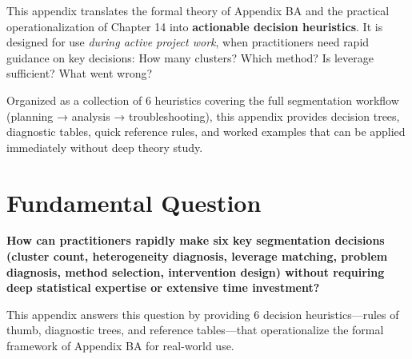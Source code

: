 \vspace{1em}


\begin{tcolorbox}[colback=blue!5!white, colframe=blue!75!black,
    title=Abstract]

This appendix translates the formal theory of Appendix BA and the practical operationalization of Chapter 14 into \textbf{actionable decision heuristics}. It is designed for use \textit{during active project work}, when practitioners need rapid guidance on key decisions: How many clusters? Which method? Is leverage sufficient? What went wrong?

Organized as a collection of 6 heuristics covering the full segmentation workflow (planning → analysis → troubleshooting), this appendix provides decision trees, diagnostic tables, quick reference rules, and worked examples that can be applied immediately without deep theory study.

\end{tcolorbox}

\vspace{1em}


\section{Fundamental Question}
\label{sec:h-fundamental}

\textbf{How can practitioners rapidly make six key segmentation decisions (cluster count, heterogeneity diagnosis, leverage matching, problem diagnosis, method selection, intervention design) without requiring deep statistical expertise or extensive time investment?}

This appendix answers this question by providing 6 decision heuristics---rules of thumb, diagnostic trees, and reference tables---that operationalize the formal framework of Appendix BA for real-world use.

\vspace{1em}


